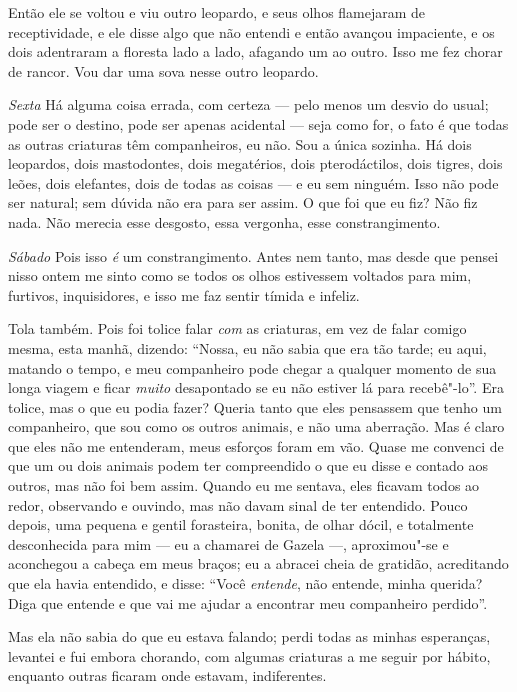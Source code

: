 Então ele se voltou e viu outro leopardo, e seus olhos flamejaram de receptividade, e ele
disse algo que não entendi e então avançou impaciente, e os dois adentraram a floresta
lado a lado, afagando um ao outro. Isso me fez chorar de rancor.
Vou dar uma sova nesse outro leopardo.

\textit{Sexta} Há alguma coisa errada, com certeza --- pelo menos um desvio do usual; pode ser
o destino, pode ser apenas acidental --- seja como for, o fato é que todas as outras
criaturas têm companheiros, eu não. Sou a única sozinha. Há dois leopardos, dois mastodontes,
dois megatérios, dois pterodáctilos, dois tigres, dois leões, dois elefantes, dois de todas as coisas
--- e eu sem ninguém. Isso não pode ser natural; sem dúvida não era para ser assim. O que
foi que eu fiz? Não fiz nada. Não merecia esse desgosto, essa vergonha, esse constrangimento.

\textit{Sábado} Pois isso \textit{é} um constrangimento. Antes nem tanto, mas desde que pensei nisso
ontem me sinto como se todos os olhos estivessem voltados para mim, furtivos, inquisidores,
e isso me faz sentir tímida e infeliz.

Tola também. Pois foi tolice falar \textit{com} as criaturas, em vez de falar comigo mesma, esta manhã,
dizendo: ``Nossa, eu não sabia que era tão tarde; eu aqui, matando o tempo, e meu companheiro pode chegar
a qualquer momento de sua longa viagem e ficar \textit{muito} desapontado se eu não estiver lá para recebê"-lo''.
Era tolice, mas o que eu podia fazer? Queria tanto que eles pensassem que tenho um companheiro,
que sou como os outros animais, e não uma aberração. Mas é claro que eles não me entenderam, meus
esforços foram em vão. Quase me convenci de que um ou dois animais podem ter compreendido
o que eu disse e contado aos outros, mas não foi bem assim. Quando eu me sentava, eles ficavam todos ao
redor, observando e ouvindo, mas não davam sinal de ter entendido. Pouco depois,
uma pequena e gentil forasteira, bonita, de olhar dócil, e totalmente desconhecida para mim --- eu a chamarei
de Gazela ---, aproximou"-se e aconchegou a cabeça em meus braços; eu a abracei cheia
de gratidão, acreditando que ela havia entendido, e disse: ``Você \textit{entende}, não entende, minha
querida? Diga que entende e que vai me ajudar a encontrar meu companheiro perdido''.

Mas ela não sabia do que eu estava falando; perdi todas as minhas esperanças, levantei e fui
embora chorando, com algumas criaturas a me seguir por hábito, enquanto outras ficaram onde estavam,
indiferentes.

